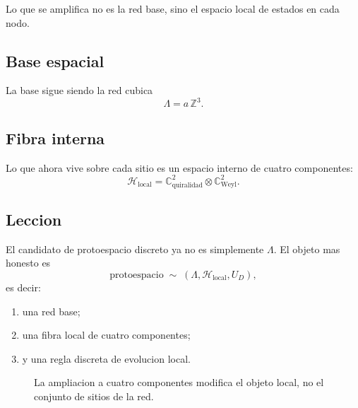 Lo que se amplifica no es la red base, sino el espacio local de estados en cada nodo.

\subsection{Base espacial}
La base sigue siendo la red cubica
\begin{equation}
\Lambda = a\,\mathbb{Z}^3.
\label{c31:eq:lattice}
\end{equation}

\subsection{Fibra interna}
Lo que ahora vive sobre cada sitio es un espacio interno de cuatro componentes:
\begin{equation}
\mathcal{H}_{\text{local}}
=
\mathbb{C}^2_{\text{quiralidad}}
\otimes
\mathbb{C}^2_{\text{Weyl}}.
\label{c31:eq:fiber}
\end{equation}

\subsection{Leccion}
El candidato de protoespacio discreto ya no es simplemente \(\Lambda\). El objeto mas honesto es
\begin{equation}
\text{protoespacio} \;\sim\; (\Lambda,\mathcal{H}_{\text{local}},U_D),
\label{c31:eq:proto}
\end{equation}
es decir:
\begin{enumerate}[label=\arabic*.]
    \item una red base;
    \item una fibra local de cuatro componentes;
    \item y una regla discreta de evolucion local.
\end{enumerate}

\begin{figure}[h!]
\centering
{}
\caption{La ampliacion a cuatro componentes modifica el objeto local, no el conjunto de sitios de la red.}
\end{figure}

